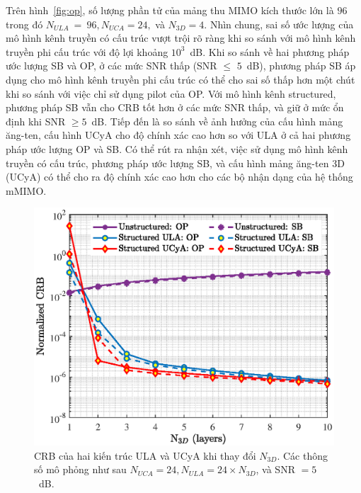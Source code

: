 Trên hình~\ref{fig:op}, số lượng phần tử của mảng thu MIMO kích thước lớn là $96$ trong đó $N_{ULA}~=~96, N_{UCA} = 24,$ và $N_{3D} = 4$. Nhìn chung, sai số ước lượng của mô hình kênh truyền có cấu trúc vượt trội rõ ràng khi so sánh với mô hình kênh truyền phi cấu trúc với độ lợi khoảng $10^3$~dB. Khi so sánh về hai phương pháp ước lượng SB và OP, ở các mức SNR thấp (SNR $\le$ $5$~dB), phương pháp SB áp dụng cho mô hình kênh truyền phi cấu trúc có thể cho sai số thấp hơn một chút khi so sánh với việc chỉ sử dụng pilot của OP. Với mô hình kênh structured, phương pháp SB vẫn cho CRB tốt hơn ở các mức SNR thấp, và giữ ở mức ổn định khi SNR $\ge 5$~dB. Tiếp đến là so sánh về ảnh hưởng của cấu hình mảng ăng-ten, cấu hình UCyA cho độ chính xác cao hơn so với ULA ở cả hai phương pháp ước lượng OP và SB. Có thể rút ra nhận xét, việc sử dụng mô hình kênh truyền có cấu trúc, phương pháp ước lượng SB, và cấu hình mảng ăng-ten 3D (UCyA) có thể cho ra độ chính xác cao hơn cho các bộ nhận dạng của hệ thống mMIMO.
\begin{figure}[H]
    \centering
    \includegraphics[width=\linewidth]{figures/fig_2_3.eps}
    \caption{CRB của hai kiến trúc ULA và UCyA khi thay đổi $N_{3D}$. Các thông số mô phỏng như sau $N_{UCA} = 24, N_{ULA} = 24 \times N_{3D}$, và SNR $=5$~dB.}
    \label{fig:op_N3D}
\end{figure}

